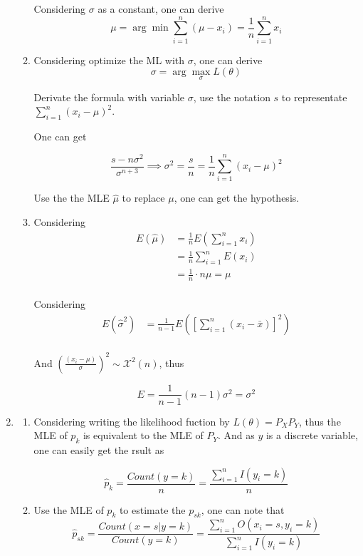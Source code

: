 \documentclass{article}
\begin{document}
\begin{enumerate}
\begin{enumerate}
Considering \(\sigma\) as a constant, one can derive
\[\mu = \arg\min \sum_{i = 1}^n(\mu - x_i) = \frac 1 n \sum_{i = 1}^n x_i\]

\item Considering optimize the ML with \(\sigma\), one can derive
\[\sigma = \arg\max_{\sigma} L(\theta)\]

Derivate the formula with variable \(\sigma\), use the notation \(s\) to representate \(\sum_{i = 1}^n (x_i - \mu
)^2\).

One can get 

\[\frac{s - n\sigma^2}{\sigma^{n + 3}} \implies \sigma^2 = \frac s n = \frac{1}{n}\sum_{i = 1}^n (x_i - \mu)^2\]

Use the the MLE  \(\hat\mu\) to replace \(\mu\), one can get the hypothesis.

\item Considering
\begin{align*}
    E(\hat \mu) &= \frac 1 n E(\sum_{i = 1}^n x_i)\\
    &= \frac 1 n \sum_{i = 1}^n E(x_i)\\
    &= \frac 1 n \cdot n\mu = \mu\\
\end{align*}

Considering
\begin{align*}
    E(\hat \sigma^2) &= \frac{1}{n - 1}E([\sum_{i = 1}^n (x_i - \bar x)]^2)\\
\end{align*}

And \((\frac{(x_i - \mu)}{\sigma})^2 \sim \mathcal{X}^2(n)\), thus

\[E = \frac{1}{n - 1}(n - 1)\sigma^2 = \sigma^2\]



\end{enumerate}

\item 
\begin{enumerate}
\item Considering writing the likelihood fuction by \(L(\theta) = P_X P_Y\), thus the MLE of \(p_k\) is equivalent to the MLE of \(P_Y\). And as \(y\) is a discrete variable, one can easily get the rsult as 

\[\hat p_k = \frac{Count(y = k)}{n} = \frac{\sum_{i = 1}^n I(y_i = k)}{n}\]

\item 
Use the MLE of \(p_k\) to estimate the \(p_{sk}\), one can note that 
\[\hat p_{sk} = \frac{Count(x = s | y = k)}{Count(y = k)} = \frac{\sum_{i = 1}^n O(x_i = s, y_i = k)}{\sum_{i = 1}^n I(y_i = k)}\]


\end{enumerate}
\end{enumerate}
\end{document}
